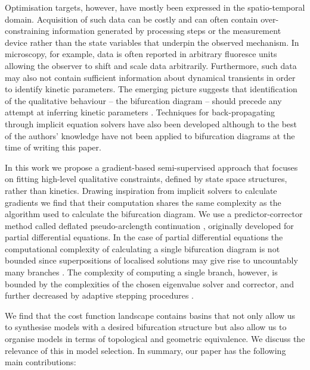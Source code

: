 Optimisation targets, however, have mostly been expressed in the spatio-temporal domain. Acquisition of such data can be costly and can often contain over-constraining information generated by processing steps or the measurement device rather than the state variables that underpin the observed mechanism. In microscopy, for example, data is often reported in arbitrary fluoresce units allowing the observer to shift and scale data arbitrarily. Furthermore, such data may also not contain sufficient information about dynamical transients in order to identify kinetic parameters. The emerging picture suggests that identification of the qualitative behaviour -- the bifurcation diagram -- should precede any attempt at inferring kinetic parameters \cite{Stumpf2019ParameterBifurcations}. Techniques for back-propagating through implicit equation solvers have also been developed \cite{Look2020DifferentiableLayers,Bai2019DeepModels} although to the best of the authors' knowledge have not been applied to bifurcation diagrams at the time of writing this paper.

In this work we propose a gradient-based semi-supervised approach that focuses on fitting high-level qualitative constraints, defined by state space structures, rather than kinetics. Drawing inspiration from implicit solvers \cite{Look2020DifferentiableLayers,Bai2019DeepModels} to calculate gradients we find that their computation shares the same  complexity as the algorithm used to calculate the bifurcation diagram. We use a predictor-corrector method called deflated pseudo-arclength continuation \cite{Farrell2016TheDiagrams,Veltz2019PseudoArcLengthContinuation.jl}, originally developed for partial differential equations. In the case of partial differential equations the computational complexity of calculating a single bifurcation diagram is not bounded since superpositions of localised solutions may give rise to uncountably many branches \cite{Avitabile2010ToEquation}. The complexity of computing a single branch, however, is bounded by the complexities of the chosen eigenvalue solver and corrector, and further decreased by adaptive stepping procedures \cite{Aruliah2016AlgorithmContinuation}.

We find that the cost function landscape contains basins that not only allow us to synthesise models with a desired bifurcation structure but also allow us to organise models in terms of topological and geometric equivalence. We discuss the relevance of this in model selection. In summary, our paper has the following main contributions:

